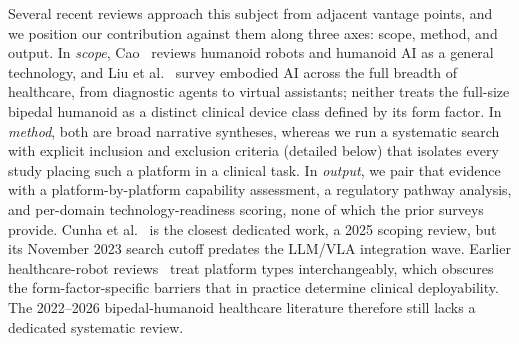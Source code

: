 \documentclass[acmsmall]{acmart}
\begin{document}
Several recent reviews approach this subject from adjacent vantage points, and we
position our contribution against them along three axes: scope, method, and
output. In \emph{scope}, Cao~\cite{cao2025humanoid} reviews humanoid robots and
humanoid AI as a general technology, and Liu et al.~\cite{liu2025screens} survey
embodied AI across the full breadth of healthcare, from diagnostic agents to
virtual assistants; neither treats the full-size bipedal humanoid as a distinct
clinical device class defined by its form factor. In \emph{method}, both are
broad narrative syntheses, whereas we run a systematic search with explicit
inclusion and exclusion criteria (detailed below) that isolates every study
placing such a platform in a clinical task. In \emph{output}, we pair
that evidence with a platform-by-platform capability assessment, a regulatory
pathway analysis, and per-domain technology-readiness scoring, none of which the
prior surveys provide. Cunha et al.~\cite{cunha2025humanoid} is the closest
dedicated work, a 2025 scoping review, but its November 2023 search cutoff
predates the LLM/VLA integration wave. Earlier healthcare-robot
reviews~\cite{azeta2018review,mukherjee2022humanoid,ozturkcan2022humanoid,huang2023intelligent,morgan2022robots}
treat platform types interchangeably, which obscures the form-factor-specific
barriers that in practice determine clinical deployability. The 2022--2026
bipedal-humanoid healthcare literature therefore still lacks a dedicated
systematic review.
\end{document}

